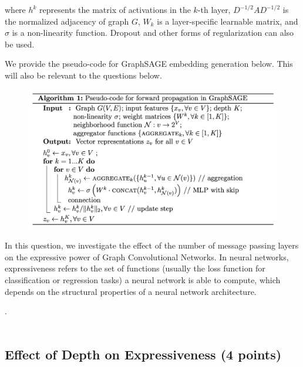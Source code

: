 \documentclass{article}
\numberwithin{figure}{section}
\begin{document}
where $h^k$ represents the matrix of activations in the $k$-th layer, $D^{-1/2}AD^{-1/2}$ is the normalized adjacency of graph $G$, $W_k$ is a layer-specific learnable matrix, and $\sigma$ is a non-linearity function. Dropout and other forms of regularization can also be used.

We provide the pseudo-code for GraphSAGE embedding generation below. This will also be relevant to the questions below.

\begin{figure}[H]
\centering
  \includegraphics[width=1\columnwidth]{CS224W_Homework1/algorithm.png}
\end{figure}

In this question, we investigate the effect of the number of message passing layers on the expressive power of Graph Convolutional Networks. In neural networks, expressiveness refers to the set of functions (usually the loss function for classification or regression tasks) a neural network is able to compute, which depends on the structural properties of a neural network architecture.

.\\\\
\subsection{Effect of Depth on Expressiveness (4 points)}
\end{document}
